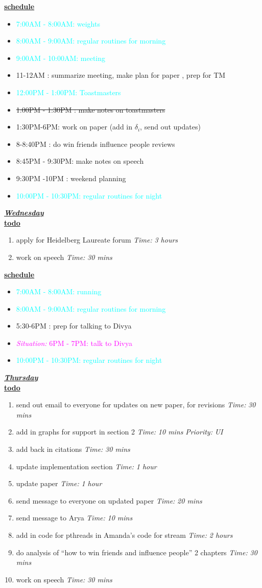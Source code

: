 \documentclass[11pt]{article}
\newcommand{\doneTask}[1]{\item \sout{#1}}
\newcommand{\timeEst}[1]{\textit{Time:} \textit{#1}}
\newcommand{\priority}[1]{\textit{Priority:} \textit{#1}}
\newcommand{\regItem}[1]{\item \textcolor{cyan}{#1}}
\newcommand{\situationItem}[1]{\item \textcolor{magenta}{\textit{Situation:} #1}}
\begin{document}
\underline{\textbf{schedule}}\\
\begin{itemize}
\regItem{7:00AM - 8:00AM: weights}
\regItem {8:00AM - 9:00AM: regular routines for morning}
\regItem {9:00AM - 10:00AM: meeting}
\item 11-12AM :  summarize meeting, make plan for paper , prep for TM
\regItem {12:00PM - 1:00PM: Toastmasters}
\doneTask{ 1:00PM - 1:30PM : make notes on toastmasters}
\item 1:30PM-6PM:  work on paper (add in $\delta_i$,  send  out updates)
\item 8-8:40PM :  do win friends influence people reviews
\item 8:45PM - 9:30PM: make notes on speech
\item 9:30PM -10PM : weekend planning
\regItem {10:00PM - 10:30PM: regular routines for night}
\end{itemize}

\underline{\textbf{\textit{Wednesday}}}\\
\underline{\textbf{todo}}\\
\begin{enumerate}
\item apply for Heidelberg Laureate forum \timeEst{3 hours}
\item work on speech \timeEst{30 mins}
\end{enumerate}
\underline{\textbf{schedule}}\\
\begin{itemize}
\regItem{7:00AM - 8:00AM: running}
\regItem{8:00AM - 9:00AM: regular routines for morning}
\item 5:30-6PM : prep for talking to Divya
\situationItem {6PM - 7PM: talk to Divya}
\regItem{10:00PM - 10:30PM: regular routines for night}

\end{itemize}

\underline{\textbf{\textit{Thursday}}}\\
\underline{\textbf{todo}}\\
\begin{enumerate}
\item send out email to everyone for updates on new paper, for revisions  \timeEst{30 mins}
\item add in graphs for support in section 2 \timeEst{10 mins} \priority{UI}
\item add back in citations \timeEst{30 mins}
\item update implementation section \timeEst{1 hour}
\item update paper  \timeEst{1 hour}
\item send message to everyone on updated paper \timeEst{20 mins}
\item send message to Arya \timeEst{10 mins}
\item add in code for pthreads in Amanda's code for stream \timeEst{2 hours}
\item do analysis of ``how to win friends and influence people'' 2 chapters \timeEst{30 mins}
\item work on speech \timeEst{30 mins}
\end{enumerate}
\end{document}
